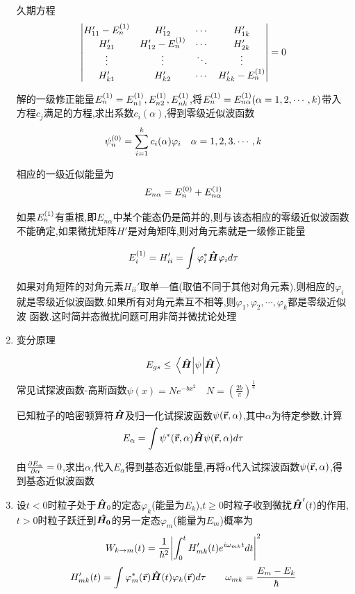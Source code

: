 \documentclass{article}
\begin{document}
\begin{formal}
\begin{enumerate}
                久期方程
                $$
                \mqty| H_{11}'-\pe{n}{1} & H_{12}' & \cdots & H_{1k}' \\ H_{21}' & H_{12}'- \pe{n}{1} & \cdots & H_{2k}' \\ \vdots & \vdots & \ddots & \vdots \\ H_{k1}' & H_{k2}' & \cdots & H_{kk}'- \pe{n}{1}| = 0
                $$

                解的一级修正能量$ E_{n}^{(1)} = E_{n1}^{(1)} , E_{n2}^{(1)} , E_{nk}^{(1)} $,将$ E_{n}^{(1)} = E_{n\alpha}^{(1)} (\alpha = 1,2,\cdots,k)$带入方程$c_{j}$满足的方程,求出系数${c_{i}(\alpha)}$,得到零级近似波函数
                $$ \psi_{n}^{(0)} = \sum\limits_{i=1}^{k}c_{i}(\alpha)\varphi_{i} \quad \alpha = 1,2,3.\cdots,k $$

                相应的一级近似能量为
                $$ E_{n\alpha} = E_{n}^{(0)} + E_{n\alpha}^{(1)} $$

                如果$E_{n}^{(1)}$有重根,即$E_{n\alpha}$中某个能态仍是简并的,则与该态相应的零级近似波函数不能确定,如果微扰矩阵$H'$是对角矩阵,则对角元素就是一级修正能量

                $$ E_{i}^{(1)} = H_{ii}' = \int \varphi_{i}^{*} \vu*{H} \varphi_{i} d\tau $$


                如果对角短阵的对角元素$H_{ii}'$取单—值(取值不同于其他对角元素),则相应的$\varphi_{i}$就是零级近似波函数.如果所有对角元素互不相等,则$\varphi_{1},\varphi_{2},\cdots,\varphi_{k}$都是零级近似波
                函数.这时简并态微扰问题可用非简并微扰论处理

                \item 变分原理
                
                $$ E_{gs} \leq  \ev{\psi}{\vu*{H}} $$
                常见试探波函数-高斯函数$ \psi(x) = N e^{-b x^{2}} \quad N =(\frac{2b}{\pi})^{\frac{1}{4}} $
                
                已知粒子的哈密顿算符$\vu*{H}$及归一化试探波函数$\psi(\va{r},\alpha)$,其中$\alpha$为待定参数,计算
                $$ E_{\alpha} = \int \psi^{*}(\va{r},\alpha) \vu*{H} \psi(\va{r},\alpha) d\tau  $$

                由$ \pdv{E_{\alpha}}{\alpha} = 0 $,求出$\alpha$,代入$E_{\alpha}$得到基态近似能量,再将$\alpha$代入试探波函数$\psi(\va{r},\alpha)$,得到基态近似波函数

                \item 设$t<0$时粒子处于$\vu*{H}_{0}$的定态$\varphi_{k}$(能量为$E_{k}$),$t \geq 0$时粒子收到微扰$\vu*{H}'(t)$的作用,$t>0$时粒子跃迁到$\vu*{H_{0}}$的另一定态$\varphi_{m}$(能量为$E_{m}$)概率为
                $$ W_{k \rightarrow m}(t) = \dfrac{1}{\hbar^{2}} \abs{ \int_{0}^{t} H_{mk}'(t) e^{i\omega_{mk}t} dt }^{2} $$
                $$ H_{mk}'(t) = \int \varphi_{m}^{*}(\va{r}) \vu*{H}(t) \varphi_{k}(\va{r}) d\tau \qquad \omega_{mk} = \dfrac{E_{m}-E_{k}}{\hbar} $$


\end{enumerate}
\end{formal}
\end{document}
